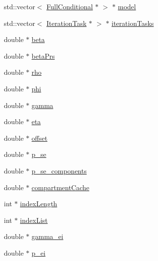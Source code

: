 \begin{DoxyCompactItemize}
\item 
std\-::vector$<$ \hyperlink{classSpatialSEIR_1_1FullConditional}{Full\-Conditional} $\ast$ $>$ $\ast$ \hyperlink{classSpatialSEIR_1_1ModelContext_ad8f3a8fd85bef0ce628c0ea0a5debc8b}{model}
\item 
std\-::vector$<$ \hyperlink{classSpatialSEIR_1_1IterationTask}{Iteration\-Task} $\ast$ $>$ $\ast$ \hyperlink{classSpatialSEIR_1_1ModelContext_a681f80cc35dd7a8bf8784710a9175d47}{iteration\-Tasks}
\item 
double $\ast$ \hyperlink{classSpatialSEIR_1_1ModelContext_a7e15e37b3aa868f1b56d0cf92a9839c8}{beta}
\item 
double $\ast$ \hyperlink{classSpatialSEIR_1_1ModelContext_abe52e0e1b4ad61cc0a71c104428c7dfc}{beta\-Prs}
\item 
double $\ast$ \hyperlink{classSpatialSEIR_1_1ModelContext_a633cc9f969abeeb3ad9d3147023af13f}{rho}
\item 
double $\ast$ \hyperlink{classSpatialSEIR_1_1ModelContext_a7873aaa6fe424c33d09287e63cdb6787}{phi}
\item 
double $\ast$ \hyperlink{classSpatialSEIR_1_1ModelContext_a4e545262577a97dd3aceeefc2a956626}{gamma}
\item 
double $\ast$ \hyperlink{classSpatialSEIR_1_1ModelContext_aeecc346cd62bc2c8a816b1451b5da64b}{eta}
\item 
double $\ast$ \hyperlink{classSpatialSEIR_1_1ModelContext_aedc2450556dd5cd0b30a0a1100843f81}{offset}
\item 
double $\ast$ \hyperlink{classSpatialSEIR_1_1ModelContext_a3039a6c9014a3465b38f5becbe369a4a}{p\-\_\-se}
\item 
double $\ast$ \hyperlink{classSpatialSEIR_1_1ModelContext_aa6a04d39cec1ace0e7c57c3551d12bc4}{p\-\_\-se\-\_\-components}
\item 
double $\ast$ \hyperlink{classSpatialSEIR_1_1ModelContext_a7146f9527fc298a50828757e477a33d3}{compartment\-Cache}
\item 
int $\ast$ \hyperlink{classSpatialSEIR_1_1ModelContext_a451632183a787d4aab8bc53c745bea40}{index\-Length}
\item 
int $\ast$ \hyperlink{classSpatialSEIR_1_1ModelContext_a9813501d8b6ac165b9676947f7835473}{index\-List}
\item 
double $\ast$ \hyperlink{classSpatialSEIR_1_1ModelContext_a72509958c44ad6153feff07ec3da9895}{gamma\-\_\-ei}
\item 
double $\ast$ \hyperlink{classSpatialSEIR_1_1ModelContext_ae0827d89df6c5eeca75216149e70b74c}{p\-\_\-ei}
\item 

\end{DoxyCompactItemize}
